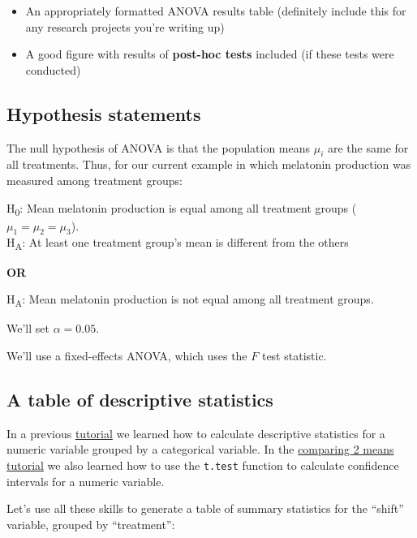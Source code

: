 \documentclass[
]{book}
\providecommand{\tightlist}{%
  \setlength{\itemsep}{0pt}\setlength{\parskip}{0pt}}
\begin{document}
\begin{itemize}
\tightlist
\item
  An appropriately formatted ANOVA results table (definitely include this for any research projects you're writing up)
\item
  A good figure with results of \textbf{post-hoc tests} included (if these tests were conducted)
\end{itemize}

\subsection{Hypothesis statements}\label{anova_hyps}

The null hypothesis of ANOVA is that the population means \(\mu_i\) are the same for all treatments. Thus, for our current example in which melatonin production was measured among treatment groups:

H\textsubscript{0}: Mean melatonin production is equal among all treatment groups (\(\mu_1 = \mu_2 = \mu_3\)).\\
H\textsubscript{A}: At least one treatment group's mean is different from the others

\textbf{OR}

H\textsubscript{A}: Mean melatonin production is not equal among all treatment groups.

We'll set \(\alpha = 0.05\).

We'll use a fixed-effects ANOVA, which uses the \(F\) test statistic.

\subsection{A table of descriptive statistics}\label{stats_anova}

In a previous \hyperref[desc_numeric_var_cat]{tutorial} we learned how to calculate descriptive statistics for a numeric variable grouped by a categorical variable. In the \hyperref[stats_2samp]{comparing 2 means tutorial} we also learned how to use the \texttt{t.test} function to calculate confidence intervals for a numeric variable.

Let's use all these skills to generate a table of summary statistics for the ``shift'' variable, grouped by ``treatment'':
\end{document}
